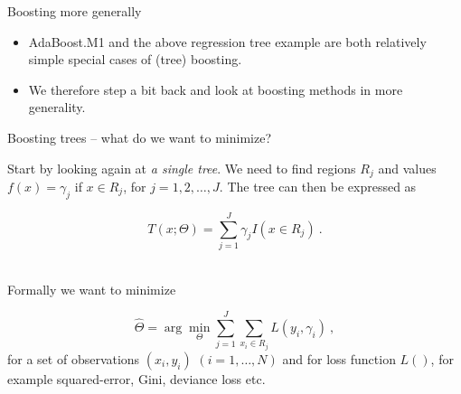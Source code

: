 \documentclass[
  10pt,
  ignorenonframetext,
]{beamer}
\providecommand{\tightlist}{%
  \setlength{\itemsep}{0pt}\setlength{\parskip}{0pt}}
\begin{document}
\begin{frame}{Boosting more generally}
\protect\hypertarget{boosting-more-generally}{}
\(~\)

\begin{itemize}
\tightlist
\item
  AdaBoost.M1 and the above regression tree example are both relatively
  simple special cases of (tree) boosting.
\end{itemize}

\vspace{2mm}

\begin{itemize}
\tightlist
\item
  We therefore step a bit back and look at boosting methods in more
  generality.
\end{itemize}
\end{frame}

\begin{frame}
\begin{block}{Boosting trees -- what do we want to minimize?}
\protect\hypertarget{boosting-trees-what-do-we-want-to-minimize}{}
\(~\)

Start by looking again at \emph{a single tree}. We need to find regions
\(R_j\) and values \(f(x)=\gamma_j\) if \(x\in R_j\), for
\(j=1,2,\ldots,J\). The tree can then be expressed as

\[T(x;\Theta) = \sum_{j=1}^J \gamma_j I(x\in R_j) \ .\] \(~\)

Formally we want to minimize

\begin{equation}\label{eq:treeopt}
\hat\Theta = \arg \min_\Theta \sum_{j=1}^J \sum_{x_i \in R_j} L(y_i,\gamma_i) \ , 
\end{equation} for a set of observations \((x_i,y_i)\)
\((i=1,\ldots,N)\) and for loss function \(L()\), for example
squared-error, Gini, deviance loss etc.
\end{block}
\end{frame}
\end{document}
